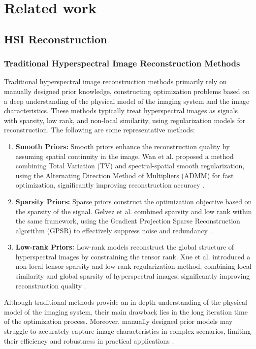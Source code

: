 \documentclass[preprint,review,12pt]{elsarticle}
\begin{document}
\section{Related work}
\label{sec:related_work}

\subsection{HSI Reconstruction}

\subsubsection{Traditional Hyperspectral Image Reconstruction Methods}

Traditional hyperspectral image reconstruction methods primarily rely on manually designed prior knowledge, constructing optimization problems based on a deep understanding of the physical model of the imaging system and the image characteristics. These methods typically treat hyperspectral images as signals with sparsity, low rank, and non-local similarity, using regularization models for reconstruction. The following are some representative methods:

\begin{enumerate}
	\item \textbf{Smooth Priors:} Smooth priors enhance the reconstruction quality by assuming spatial continuity in the image. Wan et al. proposed a method combining Total Variation (TV) and spectral-spatial smooth regularization, using the Alternating Direction Method of Multipliers (ADMM) for fast optimization, significantly improving reconstruction accuracy \cite{wan2023}.
	\item \textbf{Sparsity Priors:} Sparse priors construct the optimization objective based on the sparsity of the signal. Gelvez et al. combined sparsity and low rank within the same framework, using the Gradient Projection Sparse Reconstruction algorithm (GPSR) to effectively suppress noise and redundancy \cite{sun2022}.
	\item \textbf{Low-rank Priors:} Low-rank models reconstruct the global structure of hyperspectral images by constraining the tensor rank. Xue et al. introduced a non-local tensor sparsity and low-rank regularization method, combining local similarity and global sparsity of hyperspectral images, significantly improving reconstruction quality \cite{xue2019}.
\end{enumerate}

Although traditional methods provide an in-depth understanding of the physical model of the imaging system, their main drawback lies in the long iteration time of the optimization process. Moreover, manually designed prior models may struggle to accurately capture image characteristics in complex scenarios, limiting their efficiency and robustness in practical applications \cite{zeng2020}.
\end{document}
